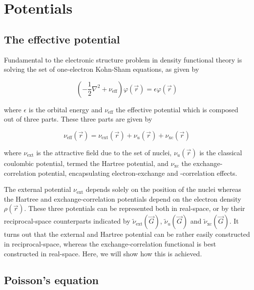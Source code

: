 %
%
%
\section{Potentials}

\subsection{The effective potential}

Fundamental to the electronic structure problem in density functional theory is solving the set of one-electron Kohn-Sham equations, as given by

\begin{equation}
    \left(-\frac{1}{2}\nabla^{2} + \nu_{\text{eff}}\right)\varphi(\vec{r}) = \epsilon \varphi(\vec{r})
    \label{eq:kohn-sham}
\end{equation}

where $\epsilon$ is the orbital energy and $\nu_{\text{eff}}$ the effective potential which is composed out of three parts. These three parts are given by

\begin{equation}
    \nu_{\text{eff}}(\vec{r}) = \nu_{\text{ext}}(\vec{r}) + \nu_{u}(\vec{r}) + \nu_{\text{xc}}(\vec{r})
\end{equation}

where $\nu_{\text{ext}}$ is the attractive field due to the set of nuclei, $\nu_{u}(\vec{r})$ is the classical coulombic potential, termed the Hartree potential, and $\nu_{\text{xc}}$ the exchange-correlation potential, encapsulating electron-exchange and -correlation effects.

The external potential $\nu_{\text{ext}}$ depends solely on the position of the nuclei whereas the Hartree and exchange-correlation potentials depend on the electron density $\rho(\vec{r})$. These three potentials can be represented both in real-space, or by their reciprocal-space counterparts indicated by $\tilde{\nu}_{\text{ext}}(\vec{G})$, $\tilde{\nu}_{u}(\vec{G})$ and $\tilde{\nu}_{\text{xc}}(\vec{G})$. It turns out that the external and Hartree potential can be rather easily constructed in reciprocal-space, whereas the exchange-correlation functional is best constructed in real-space. Here, we will show how this is achieved.

%
%
%
\subsection{Poisson's equation}

